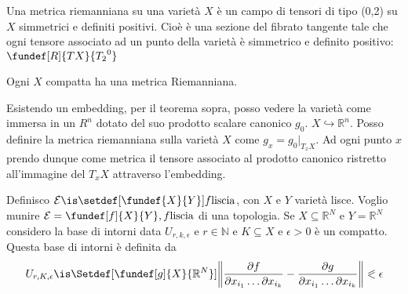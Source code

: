\begin{defn} %
 Una metrica riemanniana su una varietà $X$ è un campo di tensori di tipo (0,2) su $X$ simmetrici e definiti positivi. Cioè è una sezione del 
 fibrato tangente tale che ogni tensore associato ad un punto della varietà è simmetrico e definito positivo: $\fundef[R]{TX}{{T_{2}}^{0}}$ 
\end{defn}

\begin{teo}
Ogni $X$ compatta ha una metrica Riemanniana.
\end{teo}

\begin{dim}
  Esistendo un embedding, per il teorema sopra, posso vedere la varietà come immersa in un $R^n$ dotato del suo prodotto scalare canonico $g_{0}$. $X \hookrightarrow \mathbb{R}^{n}$.
  Posso definire la metrica riemanniana sulla varietà $X$ come $g_{x} = g_{0}|_{T_x X}$.
 Ad ogni punto $x$ prendo dunque come metrica il tensore associato al prodotto canonico ristretto all'immagine del $T_x X$ attraverso l'embedding.
\end{dim}



\begin{defn}
Definisco $\mathcal{E} \is \setdef[\fundef{X}{Y}]{f\text{liscia}}$, con $X$ e $Y$ varietà lisce. Voglio munire  $\mathcal{E} =  {\fundef[f]{X}{Y}, f \text{liscia}} $ di una topologia. Se $X \subseteq \mathbb{R}^{N}$ e $Y = \mathbb{R}^{N}$ considero
la base di intorni data $U_{r, k, \epsilon}$ e $r \in \mathbb{N}$ e $K \subseteq X$ e $\epsilon > 0$ è un compatto. Questa base di intorni è definita da 
\[U_{r, K, \epsilon} \is \Setdef[{\fundef[g]{X}{\mathbb{R}^{N}}}]{\left\|\frac{\partial f}{\partial x_{i_{1}} \dots \partial x_{i_{k}}} - \frac{\partial g}{\partial x_{i_{1}} \dots \partial x_{i_{k}}}\right\| \eqslantless \epsilon}\]
\end{defn}


